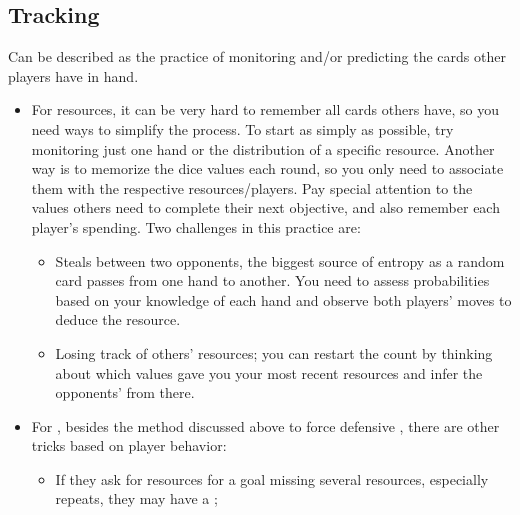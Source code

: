 \documentclass[12pt]{article}
\begin{document}
\subsection{Tracking}
Can be described as the practice of monitoring and/or predicting the cards other players have in hand.
\begin{itemize}
    \item For resources, it can be very hard to remember all cards others have, so you need ways to simplify the process.
    To start as simply as possible, try monitoring just one hand or the distribution of a specific resource.
    Another way is to memorize the dice values each round, so you only need to associate them with the respective resources/players.
    Pay special attention to the values others need to complete their next objective, and also remember each player's spending.
    Two challenges in this practice are:
    \vspace{-0.3cm}
    \begin{itemize}[noitemsep]
        \item Steals between two opponents, the biggest source of entropy as a random card passes from one hand to another.
        You need to assess probabilities based on your knowledge of each hand and observe both players' moves to deduce the resource.
        \item Losing track of others' resources; you can restart the count by thinking about which values gave you your most recent resources and infer the opponents' from there.
    \end{itemize}
    \item For , besides the method discussed above to force defensive , there are other tricks based on player behavior:
    \vspace{-0.3cm}
    \begin{itemize}[noitemsep]
        \item If they ask for resources for a goal missing several resources, especially repeats, they may have a ;

\end{itemize}
\end{itemize}
\end{document}
